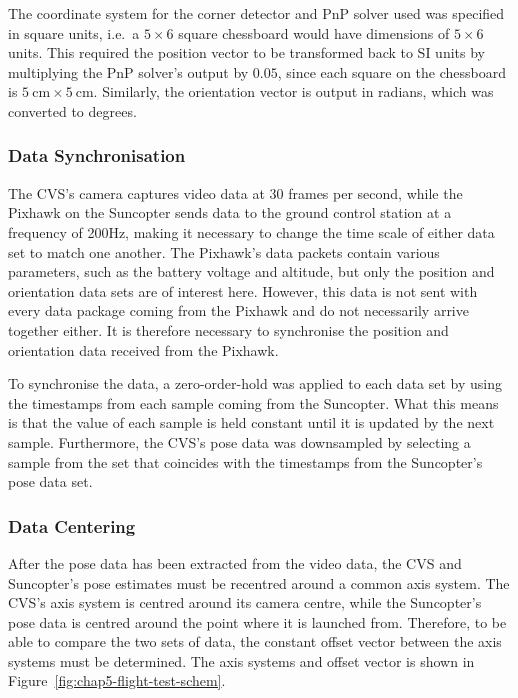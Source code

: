 The coordinate system for the corner detector and PnP solver used was specified in square units, i.e.\ a $5\times6$ square chessboard would have dimensions of $5\times6$ units. This required the position vector to be transformed back to SI units by multiplying the PnP solver's output by $0.05$, since each square on the chessboard is $\SI{5}{\cm}\times\SI{5}{\cm}$. Similarly, the orientation vector is output in radians, which was converted to degrees. 

\subsubsection{Data Synchronisation}

The CVS's camera captures video data at 30 frames per second, while the Pixhawk on the Suncopter sends data to the ground control station at a frequency of 200Hz, making it necessary to change the time scale of either data set to match one another. The Pixhawk's data packets contain various parameters, such as the battery voltage and altitude, but only the position and orientation data sets are of interest here. However, this data is not sent with every data package coming from the Pixhawk and do not necessarily arrive together either. It is therefore necessary to synchronise the position and orientation data received from the Pixhawk.

To synchronise the data, a zero-order-hold was applied to each data set by using the timestamps from each sample coming from the Suncopter. What this means is that the value of each sample is held constant until it is updated by the next sample. Furthermore, the CVS's pose data was downsampled by selecting a sample from the set that coincides with the timestamps from the Suncopter's pose data set. 

\subsubsection{Data Centering}
\label{sec:chap5-data-centring}

After the pose data has been extracted from the video data, the CVS and Suncopter's pose estimates must be recentred around a common axis system. The CVS's axis system is centred around its camera centre, while the Suncopter's pose data is centred around the point where it is launched from. Therefore, to be able to compare the two sets of data, the constant offset vector between the axis systems must be determined. The axis systems and offset vector is shown in Figure~\ref{fig:chap5-flight-test-schem}.

